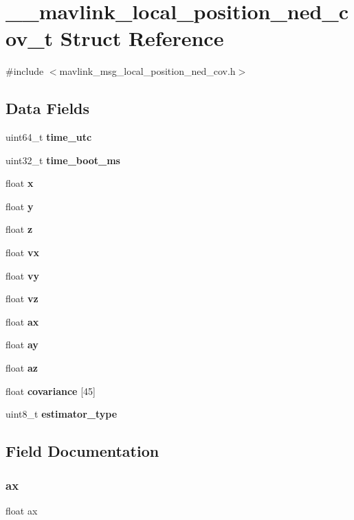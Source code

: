 \section{\+\_\+\+\_\+mavlink\+\_\+local\+\_\+position\+\_\+ned\+\_\+cov\+\_\+t Struct Reference}
\label{struct____mavlink__local__position__ned__cov__t}


{\ttfamily \#include $<$mavlink\+\_\+msg\+\_\+local\+\_\+position\+\_\+ned\+\_\+cov.\+h$>$}

\subsection*{Data Fields}
\begin{DoxyCompactItemize}
\item 
uint64\+\_\+t \textbf{ time\+\_\+utc}
\item 
uint32\+\_\+t \textbf{ time\+\_\+boot\+\_\+ms}
\item 
float \textbf{ x}
\item 
float \textbf{ y}
\item 
float \textbf{ z}
\item 
float \textbf{ vx}
\item 
float \textbf{ vy}
\item 
float \textbf{ vz}
\item 
float \textbf{ ax}
\item 
float \textbf{ ay}
\item 
float \textbf{ az}
\item 
float \textbf{ covariance} [45]
\item 
uint8\+\_\+t \textbf{ estimator\+\_\+type}
\end{DoxyCompactItemize}


\subsection{Field Documentation}
\mbox{\label{struct____mavlink__local__position__ned__cov__t_a891ecae9815b78a72f186dea5fd2bb20}} 
\subsubsection{ax}
{\footnotesize\ttfamily float ax}


